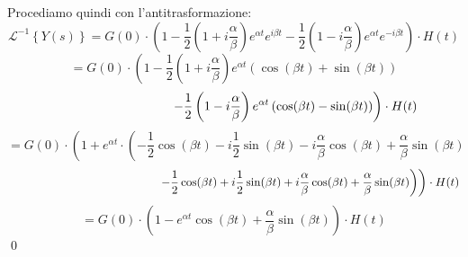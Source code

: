 \documentclass[a4paper,11pt]{article}
\begin{document}
\begin{enumerate}
$$	$$
	Procediamo quindi con l'antitrasformazione:
	$$
	\mathcal{L}^{-1} \left\{ Y(s) \right\} = G(0) \cdot \left( 1 - \frac{1}{2} \left( 1 + i \frac{\alpha}{\beta} \right) e^{\alpha t} e^{i \beta t} - \frac{1}{2} \left( 1 - i \frac{\alpha}{\beta} \right) e^{\alpha t} e^{-i \beta t} \right) \cdot H(t)
	$$
	$$
	= G(0) \cdot \left( 1 - \frac{1}{2} \left( 1 + i \frac{\alpha}{\beta} \right) e^{\alpha t} \left( \cos(\beta t) + \sin(\beta t) \right) \right.
	$$
	$$
	\hspace{3.4cm} \left. - \frac{1}{2} \left( 1 - i \frac{\alpha}{\beta} \right) e^{\alpha t} \left( \cos(\beta t) - \sin(\beta t) \right) \right) \cdot H(t)
	$$
	$$
	= G(0) \cdot \left( 1 + e^{\alpha t} \cdot \left( - \frac{1}{2} \cos(\beta t) - i \frac{1}{2} \sin(\beta t) - i \frac{\alpha}{\beta} \cos(\beta t) + \frac{\alpha}{\beta} \sin(\beta t) \right. \right.
	$$
	$$
	\hspace{4.5cm}  \left. \left. - \frac{1}{2} \cos(\beta t) + i \frac{1}{2} \sin(\beta t) + i \frac{\alpha}{\beta} \cos(\beta t) + \frac{\alpha}{\beta} \sin(\beta t) \right) \right) \cdot H(t)
	$$
	$$
	= G(0) \cdot \left( 1 - e^{\alpha t} \cos(\beta t) + \frac{\alpha}{\beta} \sin(\beta t) \right) \cdot H(t)
	$$ \qed


\end{enumerate}
\end{document}
